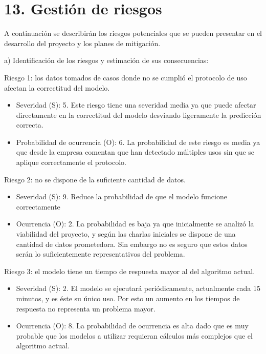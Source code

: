 \documentclass[
11pt, %
]{charter}
\begin{document}
\section{13. Gestión de riesgos}
\label{sec:riesgos}

A continuación se describirán los riesgos potenciales que se pueden presentar en el desarrollo del proyecto y los planes de mitigación.

a) Identificación de los riesgos y estimación de sus consecuencias:
 
Riesgo 1: los datos tomados de casos donde no se cumplió el protocolo de uso afectan la correctitud del modelo.
\begin{itemize}
	\item Severidad (S): 5. 
	Este riesgo tiene una severidad media ya que puede afectar directamente en la correctitud del modelo desviando ligeramente la predicción correcta.
	\item Probabilidad de ocurrencia (O): 6. 
	La probabilidad de este riesgo es media ya que desde la empresa comentan que han detectado múltiples usos sin que se aplique correctamente el protocolo.
\end{itemize}

Riesgo 2: no se dispone de la suficiente cantidad de datos.
\begin{itemize}
	\item Severidad (S): 9. 
	Reduce la probabilidad de que el modelo funcione correctamente
	\item Ocurrencia (O): 2.
	La probabilidad es baja ya que inicialmente se analizó la viabilidad del proyecto, y según las charlas iniciales se dispone de una cantidad de datos prometedora. Sin embargo no es seguro que estos datos serán lo suficientemente representativos del problema.
\end{itemize}

Riesgo 3: el modelo tiene un tiempo de respuesta mayor al del algoritmo actual.
\begin{itemize}
	\item Severidad (S): 2.
	El modelo se ejecutará periódicamente, actualmente cada 15 minutos, y es éste su único uso. Por esto un aumento en los tiempos de respuesta no representa un problema mayor.
	\item Ocurrencia (O): 8. 
	La probabilidad de ocurrencia es alta dado que es muy probable que los modelos a utilizar requieran cálculos más complejos que el algoritmo actual.
\end{itemize}
\end{document}
